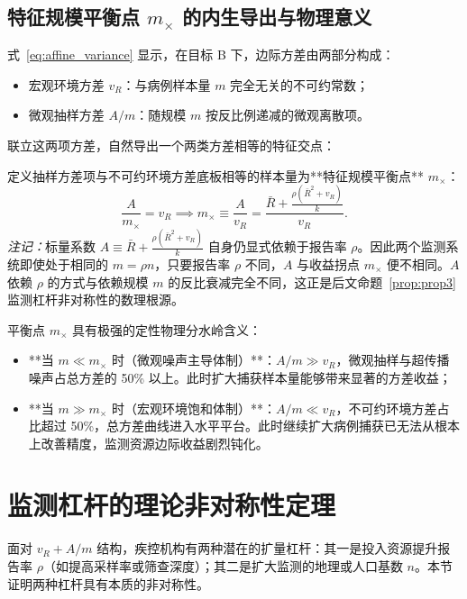 \subsection{特征规模平衡点 $m_\times$ 的内生导出与物理意义}
式~\eqref{eq:affine_variance} 显示，在目标 B 下，边际方差由两部分构成：
\begin{itemize}
    \item 宏观环境方差 $v_R$：与病例样本量 $m$ 完全无关的不可约常数；
    \item 微观抽样方差 $A/m$：随规模 $m$ 按反比例递减的微观离散项。
\end{itemize}
联立这两项方差，自然导出一个两类方差相等的特征交点：
\begin{definition}\label{def:crossover}
定义抽样方差项与不可约环境方差底板相等的样本量为**特征规模平衡点** $m_\times$：
\begin{equation}
\frac{A}{m_\times} = v_R \implies m_\times \equiv \frac{A}{v_R} = \frac{\bar{R} + \frac{\rho(\bar{R}^2 + v_R)}{k}}{v_R}. \label{eq:crossover_def}
\end{equation}
\noindent\textit{注记：}标量系数 $A \equiv \bar{R} + \frac{\rho(\bar{R}^2 + v_R)}{k}$ 自身仍显式依赖于报告率 $\rho$。因此两个监测系统即使处于相同的 $m = \rho n$，只要报告率 $\rho$ 不同，$A$ 与收益拐点 $m_\times$ 便不相同。$A$ 依赖 $\rho$ 的方式与依赖规模 $m$ 的反比衰减完全不同，这正是后文命题~\ref{prop:prop3} 监测杠杆非对称性的数理根源。
\end{definition}

平衡点 $m_\times$ 具有极强的定性物理分水岭含义：
\begin{itemize}
    \item **当 $m \ll m_\times$ 时（微观噪声主导体制）**：$A/m \gg v_R$，微观抽样与超传播噪声占总方差的 50\% 以上。此时扩大捕获样本量能够带来显著的方差收益；
    \item **当 $m \gg m_\times$ 时（宏观环境饱和体制）**：$A/m \ll v_R$，不可约环境方差占比超过 50\%，总方差曲线进入水平平台。此时继续扩大病例捕获已无法从根本上改善精度，监测资源边际收益剧烈钝化。
\end{itemize}

\section{监测杠杆的理论非对称性定理}\label{sec:prop3}

面对 $v_R + A/m$ 结构，疾控机构有两种潜在的扩量杠杆：其一是投入资源提升报告率 $\rho$（如提高采样率或筛查深度）；其二是扩大监测的地理或人口基数 $n$。本节证明两种杠杆具有本质的非对称性。


